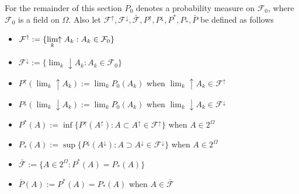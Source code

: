\begin{sectionassumption}
\label{outer}
For the remainder of this section $P_0$ denotes a probability measure on $\mathcal F_0$, where $\mathcal F_0$ is a field on $\Omega$. Also let $\mathcal F^\uparrow, \mathcal F^\downarrow,  \bar{\mathcal F}, P^\uparrow, P^\downarrow, P^*, P_*, \bar P$ be defined as follows
\begin{itemize}
\item  $\mathcal F^\uparrow := \{\displaystyle\lim_{k}\!\!\uparrow  A_k : A_k\in \mathcal F_0  \}$
\item  $\mathcal F^\downarrow := \{\lim_k\!\!\downarrow A_k : A_k\in \mathcal F_0  \}$
\item $P^\uparrow(\lim_k\!\!\uparrow A_k) := \lim_k P_0(A_k)$  when $\lim_k\!\!\uparrow A_k\in \mathcal F^\uparrow$
\item $P^\downarrow(\lim_k\!\!\downarrow A_k) := \lim_k P_0(A_k)$ when  $\lim_k\!\!\downarrow A_k\in \mathcal F^\downarrow$
\item  $P^*(A):=\inf\{P^\uparrow(A^\uparrow): A\subset A^\uparrow\in \mathcal F^\uparrow  \}$ when $A\in2^\Omega$
\item $P_*(A):=\sup\{P^\downarrow(A^\downarrow): A\supset A^\downarrow\in \mathcal F^\downarrow  \}$ when $A\in2^\Omega$
\item  $\bar{\mathcal F}:=\{ A\in 2^\Omega : P^*(A) = P_*(A)\}$
\item $\bar P(A):=P^*(A)=P_*(A)$ when $A\in \bar{\mathcal F}$
\end{itemize}
\end{sectionassumption}




